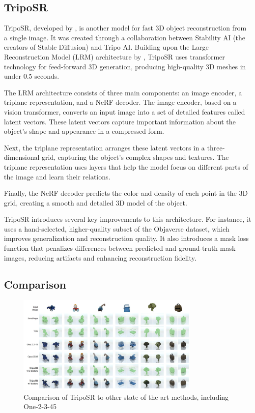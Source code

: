 \subsection{TripoSR} \label{section:triposr}
TripoSR, developed by \textcite{tochilkin_triposr_2024}, is another model for fast 3D object reconstruction from a single image.
It was created through a collaboration between Stability AI (the creators of Stable Diffusion) and Tripo AI.
Building upon the Large Reconstruction Model (LRM) architecture by \textcite{hong_lrm_2024}, TripoSR uses transformer technology for feed-forward 3D generation, producing high-quality 3D meshes in under 0.5 seconds.

The LRM architecture consists of three main components: an image encoder, a triplane representation, and a NeRF decoder. The image encoder, based on a vision transformer, converts an input image into a set of detailed features called latent vectors. These latent vectors capture important information about the object's shape and appearance in a compressed form.

Next, the triplane representation arranges these latent vectors in a three-dimensional grid, capturing the object's complex shapes and textures. The triplane representation uses layers that help the model focus on different parts of the image and learn their relations.

Finally, the NeRF decoder predicts the color and density of each point in the 3D grid, creating a smooth and detailed 3D model of the object.

TripoSR introduces several key improvements to this architecture. For instance, it uses a hand-selected, higher-quality subset of the Objaverse dataset, which improves generalization and reconstruction quality. It also introduces a mask loss function that penalizes differences between predicted and ground-truth mask images, reducing artifacts and enhancing reconstruction fidelity.

\subsection{Comparison}

\begin{figure}
    \centering
    \includegraphics[width=0.8\textwidth]{images/comparison_tripo.jpg}
    \caption{Comparison of TripoSR to other state-of-the-art methods, including One-2-3-45 \autocite{tochilkin_triposr_2024}}
    \label{fig:comparison-tripo}
\end{figure}

